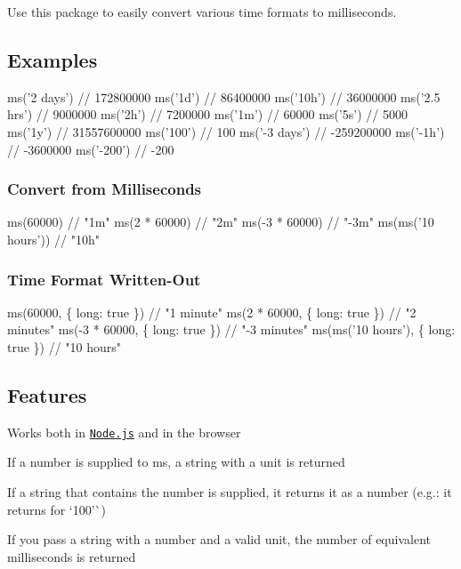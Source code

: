 \href{https://travis-ci.org/zeit/ms}{\tt } \href{https://zeit.chat/}{\tt }

Use this package to easily convert various time formats to milliseconds.

\subsection*{Examples}


\begin{DoxyCode}
ms('2 days')  // 172800000
ms('1d')      // 86400000
ms('10h')     // 36000000
ms('2.5 hrs') // 9000000
ms('2h')      // 7200000
ms('1m')      // 60000
ms('5s')      // 5000
ms('1y')      // 31557600000
ms('100')     // 100
ms('-3 days') // -259200000
ms('-1h')     // -3600000
ms('-200')    // -200
\end{DoxyCode}


\subsubsection*{Convert from Milliseconds}


\begin{DoxyCode}
ms(60000)             // "1m"
ms(2 * 60000)         // "2m"
ms(-3 * 60000)        // "-3m"
ms(ms('10 hours'))    // "10h"
\end{DoxyCode}


\subsubsection*{Time Format Written-\/\+Out}


\begin{DoxyCode}
ms(60000, \{ long: true \})             // "1 minute"
ms(2 * 60000, \{ long: true \})         // "2 minutes"
ms(-3 * 60000, \{ long: true \})        // "-3 minutes"
ms(ms('10 hours'), \{ long: true \})    // "10 hours"
\end{DoxyCode}


\subsection*{Features}


\begin{DoxyItemize}
\item Works both in \href{https://nodejs.org}{\tt Node.\+js} and in the browser
\item If a number is supplied to {\ttfamily ms}, a string with a unit is returned
\item If a string that contains the number is supplied, it returns it as a number (e.\+g.\+: it returns {} for `\textquotesingle{}100'\`{})
\item If you pass a string with a number and a valid unit, the number of equivalent milliseconds is returned
\end{DoxyItemize}

